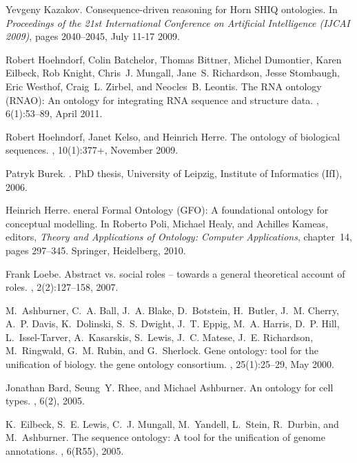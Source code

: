 \documentclass[11pt]{article}
\begin{document}
\begin{thebibliography}{10}
Yevgeny Kazakov.
\newblock Consequence-driven reasoning for {H}orn {SHIQ} ontologies.
\newblock In {\em Proceedings of the 21st International Conference on
  Artificial Intelligence (IJCAI 2009)}, pages 2040--2045, July 11-17 2009.

Robert Hoehndorf, Colin Batchelor, Thomas Bittner, Michel Dumontier, Karen
  Eilbeck, Rob Knight, Chris~J. Mungall, Jane~S. Richardson, Jesse Stombaugh,
  Eric Westhof, Craig~L. Zirbel, and Neocles~B. Leontis.
\newblock The {RNA} ontology ({RNAO}): An ontology for integrating {RNA}
  sequence and structure data.
, 6(1):53--89, April 2011.

Robert Hoehndorf, Janet Kelso, and Heinrich Herre.
\newblock The ontology of biological sequences.
, 10(1):377+, November 2009.

Patryk Burek.
.
\newblock PhD thesis, University of Leipzig, Institute of Informatics (IfI),
  2006.

Heinrich Herre.
eneral {F}ormal {O}ntology {(GFO)}: A foundational ontology for
  conceptual modelling.
\newblock In Roberto Poli, Michael Healy, and Achilles Kameas, editors, {\em
  Theory and Applications of Ontology: Computer Applications}, chapter~14,
  pages 297{--}345. Springer, Heidelberg, 2010.

Frank Loebe.
\newblock Abstract vs. social roles -- towards a general theoretical account of
  roles.
, 2(2):127--158, 2007.

M.~Ashburner, C.~A. Ball, J.~A. Blake, D.~Botstein, H.~Butler, J.~M. Cherry,
  A.~P. Davis, K.~Dolinski, S.~S. Dwight, J.~T. Eppig, M.~A. Harris, D.~P.
  Hill, L.~Issel-Tarver, A.~Kasarskis, S.~Lewis, J.~C. Matese, J.~E.
  Richardson, M.~Ringwald, G.~M. Rubin, and G.~Sherlock.
\newblock Gene ontology: tool for the unification of biology. the gene ontology
  consortium.
, 25(1):25--29, May 2000.

Jonathan Bard, Seung~Y. Rhee, and Michael Ashburner.
\newblock An ontology for cell types.
, 6(2), 2005.

K.~Eilbeck, S.~E. Lewis, C.~J. Mungall, M.~Yandell, L.~Stein, R.~Durbin, and
  M.~Ashburner.
\newblock The sequence ontology: A tool for the unification of genome
  annotations.
, 6(R55), 2005.

\end{thebibliography}
\end{document}
